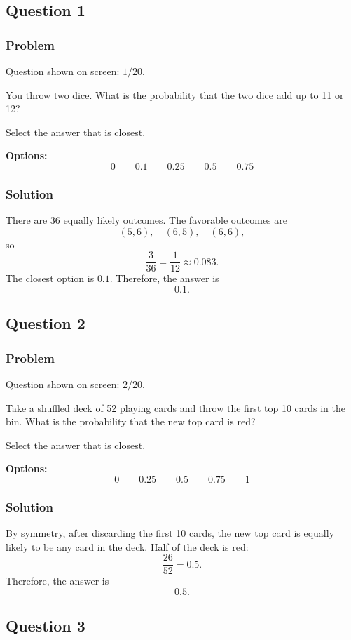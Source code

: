 \documentclass[12pt]{article}
\begin{document}
\subsection{Question 1}
\subsubsection{Problem}
Question shown on screen: \(1/20\).

You throw two dice. What is the probability that the two dice add up to 11 or 12?

Select the answer that is closest.

\noindent\textbf{Options:}
\[
\boxed{0}
\qquad
\boxed{0.1}
\qquad
\boxed{0.25}
\qquad
\boxed{0.5}
\qquad
\boxed{0.75}
\]

\subsubsection{Solution}
There are \(36\) equally likely outcomes. The favorable outcomes are
\[
(5,6),\quad (6,5),\quad (6,6),
\]
so
\[
\frac{3}{36}=\frac{1}{12}\approx 0.083.
\]
The closest option is \(0.1\). Therefore, the answer is
\[
\boxed{0.1}.
\]

\subsection{Question 2}
\subsubsection{Problem}
Question shown on screen: \(2/20\).

Take a shuffled deck of 52 playing cards and throw the first top 10 cards in the bin. What is the probability that the new top card is red?

Select the answer that is closest.

\noindent\textbf{Options:}
\[
\boxed{0}
\qquad
\boxed{0.25}
\qquad
\boxed{0.5}
\qquad
\boxed{0.75}
\qquad
\boxed{1}
\]

\subsubsection{Solution}
By symmetry, after discarding the first 10 cards, the new top card is equally likely to be any card in the deck. Half of the deck is red:
\[
\frac{26}{52}=0.5.
\]
Therefore, the answer is
\[
\boxed{0.5}.
\]

\subsection{Question 3}
\end{document}
